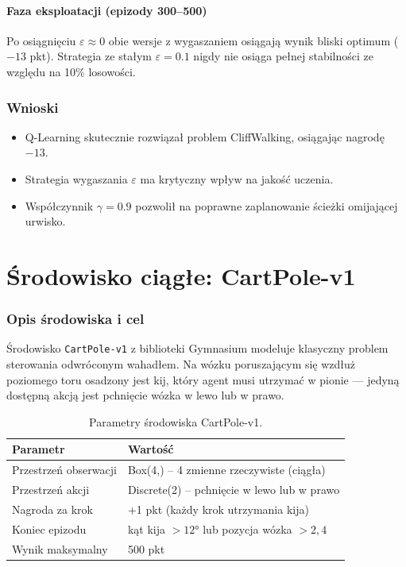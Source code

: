 \documentclass[12pt,a4paper]{article}
\begin{document}
\subsection*{Faza eksploatacji (epizody 300–500)}
Po osiągnięciu $\varepsilon \approx 0$ obie wersje z wygaszaniem osiągają wynik bliski optimum ($-13$ pkt). Strategia ze stałym $\varepsilon=0.1$ nigdy nie osiąga pełnej stabilności ze względu na 10\% losowości.

\section{Wnioski}
\begin{itemize}
    \item Q-Learning skutecznie rozwiązał problem CliffWalking, osiągając nagrodę $-13$.
    \item Strategia wygaszania $\varepsilon$ ma krytyczny wpływ na jakość uczenia.
    \item Współczynnik $\gamma=0.9$ pozwolił na poprawne zaplanowanie ścieżki omijającej urwisko.
\end{itemize}

\newpage
\part{Środowisko ciągłe: CartPole-v1}

\section{Opis środowiska i cel}

Środowisko \texttt{CartPole-v1} z biblioteki Gymnasium modeluje klasyczny problem
sterowania odwróconym wahadłem. Na wózku poruszającym się wzdłuż poziomego toru
osadzony jest kij, który agent musi utrzymać w pionie — jedyną dostępną akcją
jest pchnięcie wózka w lewo lub w prawo.

\begin{table}[h]
    \centering
    \begin{tabular}{ll}
        \toprule
        \textbf{Parametr} & \textbf{Wartość} \\
        \midrule
        Przestrzeń obserwacji & Box(4,) – 4 zmienne rzeczywiste (ciągła) \\
        Przestrzeń akcji & Discrete(2) – pchnięcie w lewo lub w prawo \\
        Nagroda za krok & +1 pkt (każdy krok utrzymania kija) \\
        Koniec epizodu & kąt kija $> 12°$ lub pozycja wózka $> 2{,}4$ \\
        Wynik maksymalny & 500 pkt \\
        \bottomrule
    \end{tabular}
    \caption{Parametry środowiska CartPole-v1.}
\end{table}
\end{document}
